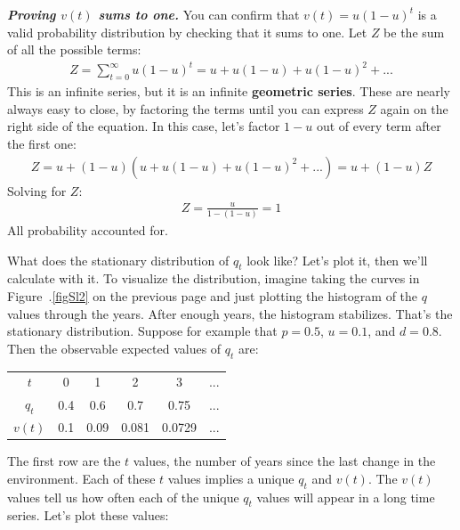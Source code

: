 \documentclass[10pt,reqno]{amsbook}
\newcommand{\bemph}[1]{{\textbf{\textcolor{bemphcol}{#1}}}}
\newcommand{\myfigref}[1]{Figure~\thechapter.\ref{#1}}
\numberwithin{equation}{chapter}
\newenvironment{mathbox}[2]
{\begin{table}[#1]
\justify\begin{tcolorbox}[enhanced, oversize]\footnotesize\noindent\textbf{\emph{#2}}}
{\end{tcolorbox}\end{table}}
\begin{document}
\begin{mathbox}{p}{Proving $v(t)$ sums to one.}
You can confirm that $v(t)=u(1-u)^t$ is a valid probability distribution by checking that it sums to one. Let $Z$ be the sum of all the possible terms:
\begin{align*}
	Z = \sum_{t=0}^\infty u(1-u)^t = u + u(1-u) + u(1-u)^2 + ...
\end{align*}
This is an infinite series, but it is an infinite \bemph{geometric series}. These are nearly always easy to close, by factoring the terms until you can express $Z$ again on the right side of the equation. In this case, let's factor $1-u$ out of every term after the first one:
\begin{align*}
	Z = u + (1-u)( u + u(1-u) + u(1-u)^2 + ... ) = u + (1-u) Z 
\end{align*}
Solving for $Z$:
\begin{align*}
	Z = \frac{u}{1-(1-u)} = 1
\end{align*}
All probability accounted for.
\end{mathbox}

What does the stationary distribution of $q_t$ look like? Let's plot it, then we'll calculate with it. To visualize the distribution, imagine taking the curves in \myfigref{figSl2} on the previous page and just plotting the histogram of the $q$ values through the years. After enough years, the histogram stabilizes. That's the stationary distribution. 
Suppose for example that $p=0.5$, $u=0.1$, and $d=0.8$. Then the observable expected values of $q_t$ are:
\begin{center}
\begin{tabular}{cccccc}
$t$ & 0 & 1 & 2 & 3 & ...\\
$q_t$ & 0.4 & 0.6 & 0.7 & 0.75 & ... \\
$v(t)$ & 0.1 & 0.09 & 0.081 & 0.0729 & ...
\end{tabular}
\end{center}
The first row are the $t$ values, the number of years since the last change in the environment. Each of these $t$ values implies a unique $q_t$ and $v(t)$. The $v(t)$ values tell us how often each of the unique $q_t$ values will appear in a long time series. Let's plot these values:
\end{document}
